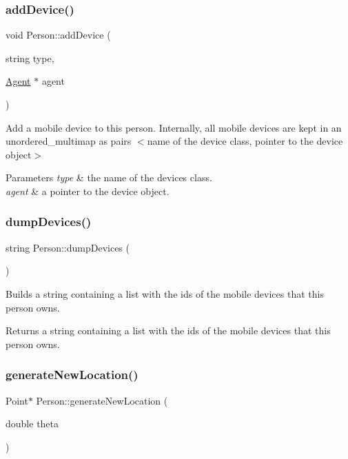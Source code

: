 \subsubsection{\texorpdfstring{addDevice()}{addDevice()}}
{\footnotesize\ttfamily void Person\+::add\+Device (\begin{DoxyParamCaption}\item[{string}]{type,  }\item[{\mbox{\hyperlink{class_agent}{Agent}} $\ast$}]{agent }\end{DoxyParamCaption})}

Add a mobile device to this person. Internally, all mobile devices are kept in an unordered\+\_\+multimap as pairs $<$name of the device class, pointer to the device object$>$ 
\begin{DoxyParams}{Parameters}
{\em type} & the name of the device\textquotesingle{}s class. \\
\hline
{\em agent} & a pointer to the device object. \\
\hline
\end{DoxyParams}
\mbox{\label{class_person_a0bc06f77b3e8a151f8c5cc77459895c9}} 
\subsubsection{\texorpdfstring{dumpDevices()}{dumpDevices()}}
{\footnotesize\ttfamily string Person\+::dump\+Devices (\begin{DoxyParamCaption}{ }\end{DoxyParamCaption})}

Builds a string containing a list with the ids of the mobile devices that this person owns. \begin{DoxyReturn}{Returns}
a string containing a list with the ids of the mobile devices that this person owns. 
\end{DoxyReturn}
\mbox{\label{class_person_a3d314ffa374b2c550e09253d041fc67f}} 
\subsubsection{\texorpdfstring{generateNewLocation()}{generateNewLocation()}}
{\footnotesize\ttfamily Point$\ast$ Person\+::generate\+New\+Location (\begin{DoxyParamCaption}\item[{double}]{theta }\end{DoxyParamCaption})\hspace{0.3cm}{\ttfamily [private]}}

